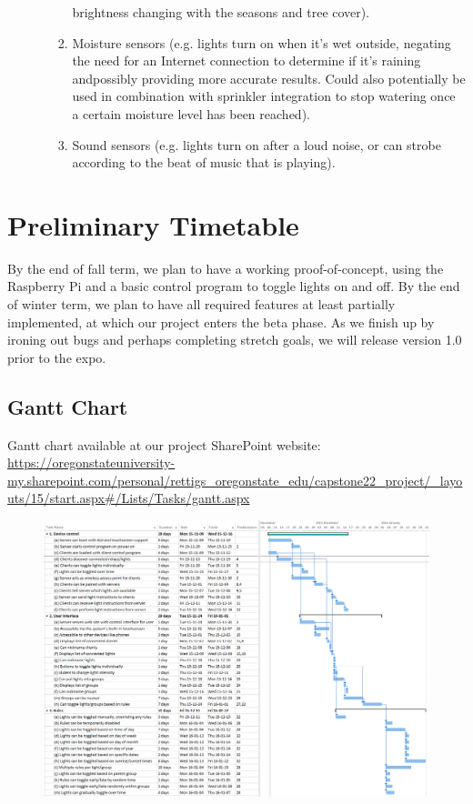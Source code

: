 \documentclass[12pt]{article}
\begin{document}
\begin{enumerate}[resume]
\begin{enumerate}
\begin{enumerate}
                        brightness changing with the seasons and tree cover).
                    \item Moisture sensors (e.g. lights turn on when it's wet
                        outside, negating the need for an Internet connection
                        to determine if it's raining andpossibly providing more
                        accurate results.  Could also potentially be used in
                        combination with sprinkler integration to stop watering
                        once a certain moisture level has been reached).
                    \item Sound sensors (e.g. lights turn on after a loud
                        noise, or can strobe according to the beat of music
                        that is playing).
                \end{enumerate}
        \end{enumerate}
\end{enumerate}

\section{Preliminary Timetable}

By the end of fall term, we plan to have a working proof-of-concept, using the
Raspberry Pi and a basic control program to toggle lights on and off.  By the
end of winter term, we plan to have all required features at least partially
implemented, at which our project enters the beta phase.  As we finish up by
ironing out bugs and perhaps completing stretch goals, we will release version
1.0 prior to the expo.

\subsection{Gantt Chart}
Gantt chart available at our project SharePoint website:
\url{https://oregonstateuniversity-my.sharepoint.com/personal/rettigs_oregonstate_edu/capstone22_project/_layouts/15/start.aspx#/Lists/Tasks/gantt.aspx}
\begin{figure}
\includegraphics[width=1.0\textwidth]{ganttchart.png}
\end{figure}
\end{document}
